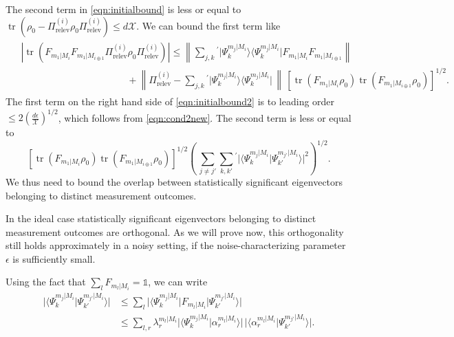 The second term in \ref{eqn:initialbound} is less or equal to $\operatorname{tr}\left(\rho_0-\Pi_{\text{relev}}^{(i)}\rho_0\Pi_{\text{relev}}^{(i)}\right)\leq d\mathcal{X}$. We can bound the first term like
\begin{align}
\label{eqn:initialbound2}
\begin{split}
& \left| \operatorname{tr}\left(F_{m_1\vert M_i} F_{m_1\vert M_{i \oplus 1}}\Pi_{\text{relev}}^{(i)}\rho_0\Pi_{\text{relev}}^{(i)}\right)\right| \leq  \left\|\sum_{j,k} {}^{'} \vert \Psi_k^{m_j\vert M_i}\rangle \langle \Psi_k^{m_j\vert M_i} \vert F_{m_1\vert M_i} F_{m_1 \vert M_{i\oplus 1}}\right\| \\
& \hspace{11em} + \left\|\Pi_{\text{relev}}^{(i)} - \sum_{j,k} {}^{'} \vert \Psi_k^{m_j\vert M_i}\rangle \langle \Psi_k^{m_j\vert M_i} \vert \, \right\| \,\left[ \operatorname{tr}(F_{m_1\vert M_i}\rho_0)\operatorname{tr}(F_{m_1\vert M_{i\oplus 1}}\rho_0)\right]^{1/2}.
\end{split}
\end{align}
The first term on the right hand side of \ref{eqn:initialbound2} is to leading order $\leq 2\left(\frac{d\epsilon}{\mathcal{X}}\right)^{1/2}$, which follows from \ref{eqn:cond2new}. The second term is less or equal to
\begin{equation}
\label{eqn:tobound}
\left[\operatorname{tr}(F_{m_1\vert M_i}\rho_0)\operatorname{tr}(F_{m_1\vert M_{i\oplus 1}}\rho_0)\right]^{1/2}\left(\,\sum_{j\neq j'}\sum_{k,k'}{}^{'}\vert \langle \Psi_k^{m_j\vert M_i}\vert \Psi_{k'}^{m_{j'}\vert M_i} \rangle \vert^2\right)^{1/2}.
\end{equation}
We thus need to bound the overlap between statistically significant eigenvectors belonging to distinct measurement outcomes.

In the ideal case statistically significant eigenvectors belonging to distinct measurement outcomes are orthogonal. As we will prove now, this orthogonality still holds approximately in a noisy setting, if the noise-characterizing parameter $\epsilon$ is sufficiently small.

Using the fact that $\sum_{l} F_{m_{l}\vert M_i}=\mathbb{1}$, we can write
\begin{align}
\vert\langle \Psi_k^{m_j\vert M_i} \vert \Psi_{k'}^{m_{j'}\vert M_i}\rangle \vert & \leq \sum_l \vert \langle \Psi_k^{m_j\vert M_i} \vert F_{m_l\vert M_i}\vert \Psi_{k'}^{m_{j'}\vert M_i}\rangle\vert \\
\label{eqn:toinsert}
& \leq \sum_{l,r}\lambda_r^{m_l\vert M_i}\vert \langle \Psi_k^{m_j\vert M_i} \vert \alpha_r^{m_l\vert M_i}\rangle \vert \, \vert \langle \alpha_r^{m_l\vert M_i}\vert \Psi_{k'}^{m_{j'}\vert M_i}\rangle \vert.
\end{align}

